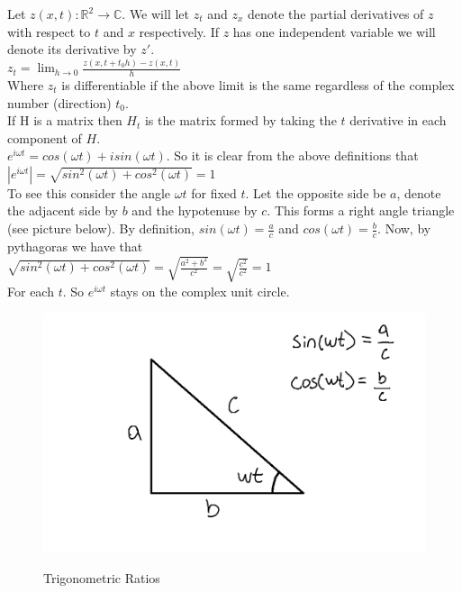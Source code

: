 \documentclass[12pt]{article}
\begin{document}
Let $z(x,t): \mathbb{R}^{2} \rightarrow \mathbb{C}$. We will let $z_{t}$ and 
$z_{x}$ denote 
the partial derivatives of $z$ with respect to $t$ and $x$ respectively. If $z$ 
has 
one independent 
variable we will denote its derivative by $z'$. \\ 

$ z_{t} = \lim_{h \to 0 } \frac{z(x,t+ t_{0}h) - z(x,t)}{h}$ \\ 

Where $z_{t}$ is differentiable if the above limit is the same regardless of 
the complex number (direction) $t_{0}$. \\

If H is a matrix then $H_{t}$ 
is the 
matrix formed by taking the $t$ derivative in each component of $H$.\\ 

$ e^{i \omega t} = cos(\omega t) + i sin(\omega t)$. So it is clear from the 
above definitions that \\

$ |e^{i \omega t}| = \sqrt{sin^{2} (\omega t) + cos^{2} (\omega t)} =1$ \\  

To see this consider the angle $\omega t$ for fixed $t$. Let the opposite side 
be $a$, denote 
the adjacent side by $b$ and the hypotenuse by $c$. This forms a right angle 
triangle (see picture below). By definition,  $sin(\omega t) = \frac{a}{c} $ 
and $ cos(\omega t) = \frac{b}{c} $. Now, by pythagoras we have that\\

$ \sqrt{sin^{2} (\omega t) + cos^{2} (\omega t)} = 
\sqrt{\frac{a^{2}+b^{2}}{c^{2}} } = \sqrt{ \frac{c^{2}}{c^{2} } }= 1 $ \\ 

For each $t$. So $e^{i \omega t}$ stays on the complex unit circle. \\

\begin{figure}[h!]
	\begin{center}
		{
			\includegraphics[width=\textwidth]{pytha.png}
		} 
	\caption{Trigonometric Ratios}
	\end{center}
\end{figure}
\end{document}
